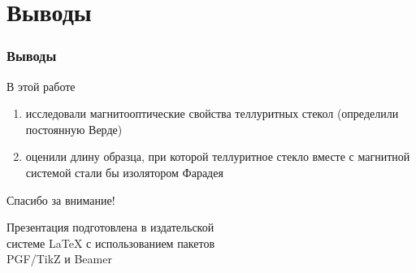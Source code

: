 \documentclass[10pt,pdf,hyperref={unicode}, dvipsnames, handout]{beamer}
\begin{document}


	
\section{Выводы}
\begin{frame}
	\frametitle{Выводы}
	В этой работе 
		\begin{enumerate}
		\item исследовали магнитооптические свойства теллуритных стекол (определили постоянную Верде)
		\item оценили длину образца, при которой теллуритное стекло вместе с магнитной системой стали бы изолятором Фарадея
	\end{enumerate}
\end{frame}

\begin{frame}[plain]
	\vspace{4cm}
	\begin{center}
		\Huge
		Спасибо за внимание!
	\end{center}
	\vspace{2.5cm}
	\begin{center}
		\color{black!30!white}
		Презентация подготовлена в издательской \\
		системе LaTeX с использованием пакетов \\
		PGF/TikZ и Beamer
	\end{center}
\end{frame}
\end{document}
